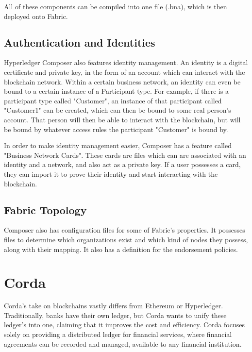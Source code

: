 
All of these components can be compiled into one file (.bna), which is then deployed onto Fabric.

\subsection{Authentication and Identities}

Hyperledger Composer also features identity management. An identity is a digital certificate and private key, in the form of an account which can interact with the blockchain network. Within a certain business network, an identity can even be bound to a certain instance of a Participant type. For example, if there is a participant type called "Customer", an instance of that participant called "Customer1" can be created, which can then be bound to some real person's account. That person will then be able to interact with the blockchain, but will be bound by whatever access rules the participant "Customer" is bound by. 

In order to make identity management easier, Composer has a feature called "Business Network Cards". These cards are files which can are associated with an identity and a network, and also act as a private key. If a user possesses a card, they can import it to prove their identity and start interacting with the blockchain.

\subsection{Fabric Topology}

Composer also has configuration files for some of Fabric's properties. It possesses files to determine which organizations exist and which kind of nodes they possess, along with their mapping. It also has a definition for the endorsement policies.


\section{Corda}
Corda's take on blockchains vastly differs from Ethereum or Hyperledger. Traditionally, banks have their own ledger, but Corda wants to unify these ledger's into one, claiming that it improves the cost and efficiency. Corda focuses solely on providing a distributed ledger for financial services, where financial agreements can be recorded and managed, available to any financial institution\cite{Brown2016}. 

